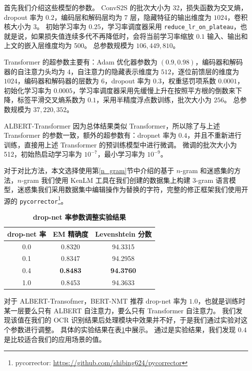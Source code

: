 首先我们介绍这些模型的参数。
ConvS2S 的批次大小为 32，损失函数为交叉熵，dropout 率为 $0.2$，编码层和解码层均为 7 层，隐藏特征的输出维度为 $1024$，卷积核大小为 3。
初始学习率为 $0.25$，学习率调度器采用 \texttt{reduce\_lr\_on\_plateau}，也就是说，如果损失值连续多代不再降低时，会将当前学习率缩放 $0.1$
输入、输出和上文的嵌入层维度均为 500。
总参数规模为 $106,449,810$。

Transformer 的超参数主要有：Adam 优化器参数为 $(0.9, 0.98)$，编码器和解码器的自注意力头均为 $4$，自注意力的隐藏表示维度为 $512$，逐位前馈层的维度为 $1024$，编码器和解码器的层数为 6，dropout 率为 $0.3$，权重惩罚项系数 $0.0001$，初始化学习率为 $0.0005$，学习率调度器采用先缓慢上升在按照平方根的倒数来下降，标签平滑交叉熵系数为 $0.1$，采用半精度浮点数训练，批次大小为 $256$。
总参数规模为 $37,220,352$。

ALBERT-Transformer 因为总体结果类似 Transformer，所以除了与上述 Transformer 的参数一致，额外的超参数有：dropnet 率为 $0.4$，并且不重新进行训练，直接用上述 Transformer 的预训练模型中进行微调。
微调的批次大小为 512，初始热启动学习率为 $10^{-7}$，最小学习率为 $10^{-9}$。

对于对比方法，本文选择使用第\ref{n_gram}节中介绍的基于 $n$-gram 和迷惑集的方法，$n$-gram 我们使用 KenLM 工具在我们创建的数据集上构建 $3$-gram 语言模型，迷惑集我们采用数据集中编辑操作为替换的字符，完整的修正框架我们使用开源的 \texttt{pycorrector}\footnote{pycorrector: \url{https://github.com/shibing624/pycorrector}}。

\begin{table}[!hpt]
	\caption[]{\textbf{drop-net 率参数调整实验结果}}
	\label{tab:result_dropnet}
	\centering
	\begin{tabular}{c c c}
		\hline
		\textbf{drop-net 率} & \textbf{EM 精确度} & \textbf{Levenshtein 分数} \\
		\hline
		0.0 & 0.8320 & 94.3315 \\
		0.1 & 0.8347 & 94.2958 \\
		0.4 & \textbf{0.8483} & \textbf{94.3760} \\
		1.0 & 0.8453 & 94.3633 \\
		\hline
	\end{tabular}
\end{table}

对于 ALBERT-Transofmer，BERT-NMT\cite{bert_nmt} 推荐 drop-net 率为 $1.0$，也就是训练时某一层要么只有 ALBERT 自注意力，要么只有 Transformer 自注意力。
我们发现该值在我们的 OCR 识别结果后处理模块中效果并不好，于是我们通过实验对这个参数进行调整。
具体的实验结果在表\ref{tab:result_dropnet}中展示。
通过是实验结果，我们发现 $0.4$ 是比较适合我们的应用场景的值。

